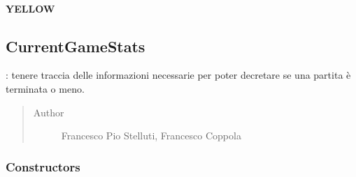 \documentclass[letterpaper,10pt,italian,openany,oneside]{sphinxmanual}
\begin{document}
\paragraph{YELLOW}
\label{\detokenize{source/it/unicam/cs/pa/mastermind/gamecore/ColorPegs:yellow}}

\begin{fulllineitems}
\label{\detokenize{source/it/unicam/cs/pa/mastermind/gamecore/ColorPegs:it.unicam.cs.pa.mastermind.gamecore.ColorPegs.YELLOW}}
\end{fulllineitems}



\subsection{CurrentGameStats}
\label{\detokenize{source/it/unicam/cs/pa/mastermind/gamecore/CurrentGameStats:currentgamestats}}\label{\detokenize{source/it/unicam/cs/pa/mastermind/gamecore/CurrentGameStats::doc}}

\begin{fulllineitems}
\label{\detokenize{source/it/unicam/cs/pa/mastermind/gamecore/CurrentGameStats:it.unicam.cs.pa.mastermind.gamecore.CurrentGameStats}}
: tenere traccia delle informazioni necessarie per poter decretare se una partita è terminata o meno.
\begin{quote}\begin{description}
\item[{Author}] \leavevmode
Francesco Pio Stelluti, Francesco Coppola

\end{description}\end{quote}

\end{fulllineitems}



\subsubsection{Constructors}
\label{\detokenize{source/it/unicam/cs/pa/mastermind/gamecore/CurrentGameStats:constructors}}
\end{document}
